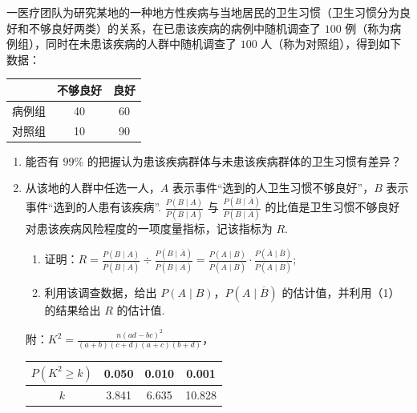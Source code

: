 \begin{problem}
一医疗团队为研究某地的一种地方性疾病与当地居民的卫生习惯（卫生习惯分为良好和不够良好两类）的关系，在已患该疾病的病例中随机调查了 \(100\) 例（称为病例组），同时在未患该疾病的人群中随机调查了 \(100\) 人（称为对照组），得到如下数据：

\begin{center}
\begin{tabular}{|c|c|c|}
\hline
 & 不够良好 & 良好 \\
\hline
病例组 & 40 & 60 \\
\hline
对照组 & 10 & 90 \\
\hline
\end{tabular}
\end{center}

\begin{enumerate}
\item 能否有 \(99\%\) 的把握认为患该疾病群体与未患该疾病群体的卫生习惯有差异？

\item 从该地的人群中任选一人，\(A\) 表示事件“选到的人卫生习惯不够良好”，\(B\) 表示事件“选到的人患有该疾病”. \(\frac{P(B\mid A)}{P(\overline B\mid A)}\) 与 \(\frac{P(B\mid \overline A)}{P(\overline B\mid \overline A)}\) 的比值是卫生习惯不够良好对患该疾病风险程度的一项度量指标，记该指标为 \(R\).

\begin{enumerate}
\item 证明：\(R=\frac{P(B\mid A)}{P(\overline B\mid A)}\div \frac{P(B\mid \overline A)}{P(\overline B\mid \overline A)}=\frac{P(A\mid B)}{P(\overline A\mid B)}\cdot \frac{P(\overline A\mid \overline B)}{P(A\mid \overline B)};\)

\item 利用该调查数据，给出 \(P(A\mid B)\)，\(P(A\mid \overline B)\) 的估计值，并利用（1）的结果给出 \(R\) 的估计值.
\end{enumerate}

附：\(K^2=\frac{n(ad-bc)^2}{(a+b)(c+d)(a+c)(b+d)}\)，

\begin{center}
\begin{tabular}{|c|c|c|c|}
\hline
\(P(K^2\ge k)\) & 0.050 & 0.010 & 0.001 \\
\hline
\(k\) & 3.841 & 6.635 & 10.828 \\
\hline
\end{tabular}
\end{center}
\end{enumerate}
\end{problem}

